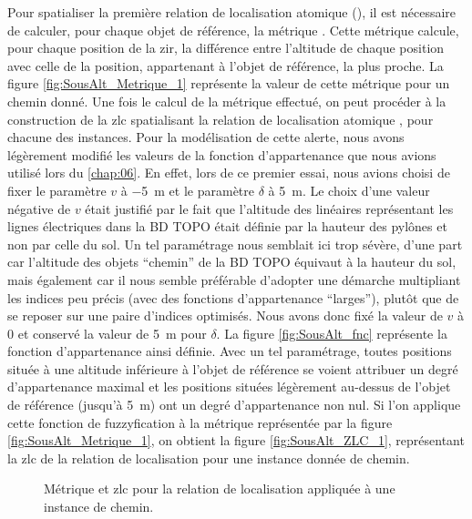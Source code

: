 Pour spatialiser la première relation de localisation atomique
(), il est nécessaire de calculer, pour
chaque objet de référence, la métrique
. Cette métrique calcule, pour chaque
position de la \ac{zir}, la différence entre l'altitude de chaque
position avec celle de la position, appartenant à l'objet de
référence, la plus proche. La figure \ref{fig:SousAlt_Metrique_1}
représente la valeur de cette métrique pour un chemin donné. Une fois
le calcul de la métrique effectué, on peut procéder à la construction
de la \ac{zlc} spatialisant la relation de localisation atomique
, pour chacune des instances. Pour la
modélisation de cette alerte, nous avons légèrement modifié les
valeurs de la fonction d'appartenance que nous avions utilisé lors du
\autoref{chap:06}. En effet, lors de ce premier essai, nous avions
choisi de fixer le paramètre \(v\) à \SI{-5}{\meter} et le paramètre
\(\delta\) à \SI{5}{\meter}. Le choix d'une valeur négative de \(v\)
était justifié par le fait que l'altitude des linéaires représentant
les lignes électriques dans la BD TOPO était définie par la hauteur
des pylônes et non par celle du sol. Un tel paramétrage nous semblait
ici trop sévère, d'une part car l'altitude des objets \enquote{chemin}
de la BD TOPO équivaut à la hauteur du sol, mais également car il nous
semble préférable d'adopter une démarche multipliant les indices peu
précis (\ie avec des fonctions d'appartenance \enquote{larges}),
plutôt que de se reposer sur une paire d'indices optimisés. Nous avons
donc fixé la valeur de \(v\) à 0 et conservé la valeur de
\SI{5}{\meter} pour \(\delta\). La figure \ref{fig:SousAlt_fnc}
représente la fonction d'appartenance ainsi définie. Avec un tel
paramétrage, toutes positions située à une altitude inférieure à
l'objet de référence se voient attribuer un degré d'appartenance
maximal et les positions situées légèrement au-dessus de l'objet de
référence (jusqu'à \SI{5}{\meter}) ont un degré d'appartenance non
nul. Si l'on applique cette fonction de fuzzyfication à la métrique
représentée par la figure \ref{fig:SousAlt_Metrique_1}, on obtient la
figure \ref{fig:SousAlt_ZLC_1}, représentant la \ac{zlc} de la
relation de localisation  pour une instance
donnée de chemin.

\begin{figure}
  \centering
  
  \caption{Métrique \protect{} et
    \ac{zlc} \protect{} pour la relation de
    localisation \protect{} appliquée à une
    instance de chemin.}
  \label{fig:SousAlt_1}
\end{figure}

